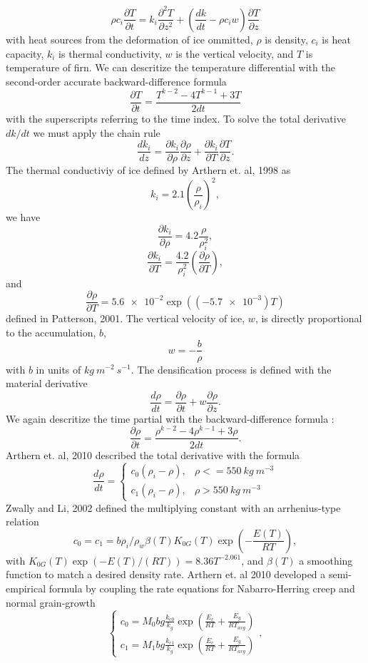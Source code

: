 \documentclass{article}%
\begin{document}
  $$
  \rho c_i \frac{\partial T}{\partial t} = 
    k_i \frac{\partial^2 T}{\partial z^2} +
    \left( \frac{dk}{dt} - \rho c_i w \right) \frac{\partial T}{\partial z}
  $$
with heat sources from the deformation of ice ommitted, $\rho$ is density, $c_i$ is heat capacity, $k_i$ is thermal conductivity, $w$ is the vertical velocity, and $T$ is temperature of firn.  We can descritize the temperature differential with the second-order accurate backward-difference formula
  $$\frac{\partial T}{\partial t} = \frac{T^{k-2} - 4T^{k-1} + 3T}{2dt}$$
with the superscripts referring to the time index.
To solve the total derivative $dk/dt$ we must apply the chain rule
  $$
  \frac{dk_i}{dz} = 
  \frac{\partial k_i}{\partial \rho} \frac{\partial \rho}{\partial z} + 
  \frac{\partial k_i}{\partial T} \frac{\partial T}{\partial z}.
  $$
The thermal conductiviy of ice defined by Arthern et. al, 1998 as
  $$k_i = 2.1 \left(\frac{\rho}{\rho_i}\right)^2,$$
we have
  $$
  \frac{\partial k_i}{\partial \rho} = 
    4.2 \frac{\rho}{\rho_i^2},
  $$
  $$
  \frac{\partial k_i}{\partial T} = 
    \frac{4.2}{\rho_i^2} \left( \frac{\partial \rho}{\partial T} \right),
  $$
and
  $$
  \frac{\partial \rho}{\partial T} = 
    \SI{5.6e-2} \exp ((\SI{-5.7e-3})T)
  $$
defined in Patterson, 2001.  The vertical velocity of ice, $w$, is directly proportional to the accumulation, $b$,
  $$
  w = -\frac{b}{\rho}
  $$
with $b$ in units of $kg\ m^{-2}\ s^{-1}$.  The densification process is defined with the material derivative
  $$\frac{d \rho}{dt} = \frac{\partial \rho}{\partial t} + 
    w\frac{\partial \rho}{\partial z}.$$
We again descritize the time partial with the backward-difference formula :
  $$\frac{\partial \rho}{\partial t} = 
      \frac{\rho^{k-2} - 4\rho^{k-1} + 3\rho}{2dt}.$$
Arthern et. al, 2010 described the total derivative with the formula  
  $$
  \frac{d \rho}{dt} = 
  \begin{cases}
   c_0(\rho_i - \rho), &\rho <= 550\ kg\ m^{-3}\\
   c_1(\rho_i - \rho), &\rho > 550\ kg\ m^{-3}
  \end{cases}$$
Zwally and Li, 2002 defined the multiplying constant with an arrhenius-type relation
  $$
  c_0 = c_1 = 
  b \rho_i / \rho_w \beta(T)K_{0G}(T)\exp \left( -\frac{E(T)}{RT} \right),
  $$
with $K_{0G}(T) \exp(-E(T)/(RT)) = 8.36T^{-2.061}$, and $\beta(T)$ a smoothing function to match a desired density rate.  Arthern et. al 2010 developed a semi-empirical formula by coupling the rate equations for Nabarro-Herring creep and normal grain-growth  
  $$
  \begin{cases}
    c_0 = M_0 bg\frac{k_{c0}}{k_g}\exp\left(\frac{E_c}{RT} + 
          \frac{E_g}{RT_{avg}}\right)\\
    c_1 = M_1 bg\frac{k_{c1}}{k_g}\exp\left(\frac{E_c}{RT} + 
          \frac{E_g}{RT_{avg}}\right)
  \end{cases},
  $$
\end{document}
